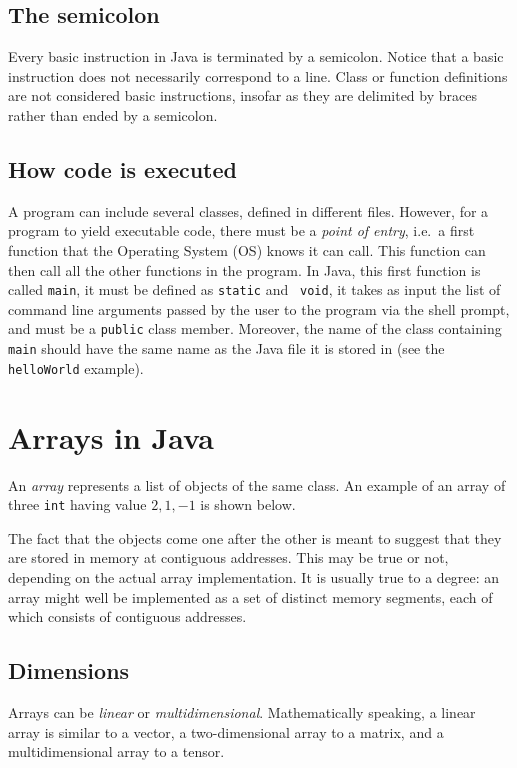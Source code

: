 \documentclass[a4paper]{book}
\theoremstyle{changebreak}                %
\begin{document}
\subsection{The semicolon}
Every basic instruction in Java is terminated
by a semicolon.\index{;} Notice that a basic
instruction does not necessarily correspond to a line. Class or
function definitions are not considered basic instructions, insofar as
they are delimited by braces rather than ended by a semicolon.

\subsection{How code is executed}
A program can include several classes, defined in different
files. However, for a program to yield executable
code, there must be a {\it point of
  entry}, i.e.~a first function that the
Operating System (OS) knows it can
call. This function can then call all the other functions in the
program. In Java, this first function is called {\tt main}, it must be defined as {\tt static} and {\tt
  void}, it takes as input the list of command line
arguments passed by the user to the program via the shell
prompt, and must be a {\tt public} class
member. Moreover, the name of the class containing
{\tt main} should have the same name as the Java file it
is stored in (see the {\tt helloWorld} example).

\section{Arrays in Java}
\label{s:java:array}
An {\it array} represents a list of objects
of the same class. An example of an array of three {\tt int} having
value $2,1,-1$ is shown below.
\begin{center}
\end{center}
The fact that the objects come one after the other is meant to suggest
that they are stored in memory at contiguous addresses. This may be
true or not, depending on the actual array implementation. It is
usually true to a degree: an array might well be implemented as a set
of distinct memory segments, each of which consists of contiguous
addresses. 

\subsection{Dimensions}
Arrays can be {\it linear} or {\it
  multidimensional}. Mathematically
speaking, a linear array is similar to a vector, a
two-dimensional array to a
matrix, and a multidimensional array to a
tensor.
\end{document}
